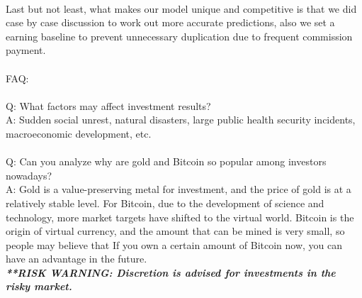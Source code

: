 \documentclass[12pt]{article}
\begin{document}
\paragraph{}
Last but not least, what makes our model unique and competitive is that we did case by case discussion to work out more accurate predictions, also we set a earning baseline to prevent unnecessary duplication due to frequent commission payment.
\\ \hspace*{\fill} \\
FAQ:
\\ \hspace*{\fill} \\
Q: What factors may affect investment results?\\
A: Sudden social unrest, natural disasters, large public health security incidents, macroeconomic development, etc.
\\ \hspace*{\fill} \\
Q: Can you analyze why are gold and Bitcoin so popular among investors nowadays?\\
A: Gold is a value-preserving metal for investment, and the price of gold is at a relatively stable level. For Bitcoin, due to the development of science and technology, more market targets have shifted to the virtual world. Bitcoin is the origin of virtual currency, and the amount that can be mined is very small, so people may believe that If you own a certain amount of Bitcoin now, you can have an advantage in the future.\\

\emph{\textbf{**RISK WARNING: Discretion is advised for investments in the risky market.}}
\end{document}
